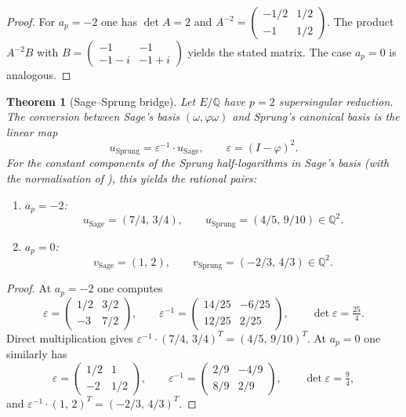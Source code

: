 \documentclass[11pt,a4paper]{amsart}
\newtheorem{theorem}{Theorem}[section]
\theoremstyle{definition}
\newcommand{\Q}{\mathbb{Q}}
\newcommand{\eps}{\varepsilon}
\begin{document}
\begin{proof}
For $a_p = -2$ one has $\det A = 2$ and
$A^{-2} = \begin{pmatrix} -1/2 & 1/2 \\ -1 & 1/2 \end{pmatrix}$.
The product $A^{-2} B$ with $B = \begin{pmatrix} -1 & -1 \\ -1-i & -1+i \end{pmatrix}$ yields the stated matrix. The case $a_p = 0$ is analogous.
\end{proof}

\begin{theorem}[Sage--Sprung bridge]\label{thm:bridge}
Let $E/\Q$ have $p = 2$ supersingular reduction. The conversion between Sage's basis $(\omega, \varphi\omega)$ and Sprung's canonical basis is the linear map
\begin{equation}
u_{\mathrm{Sprung}} = \eps^{-1} \cdot u_{\mathrm{Sage}}, \qquad \eps = (I - \varphi)^2.
\end{equation}
For the constant components of the Sprung half-logarithms in Sage's basis (with the normalisation of \cite[\S 5]{Sprung2012}), this yields the rational pairs:
\begin{enumerate}
\item[(i)] $a_p = -2$:
\begin{equation}
u_{\mathrm{Sage}} = (7/4,\, 3/4), \qquad u_{\mathrm{Sprung}} = (4/5,\, 9/10) \in \Q^2.
\end{equation}
\item[(ii)] $a_p = 0$:
\begin{equation}
v_{\mathrm{Sage}} = (1,\, 2), \qquad v_{\mathrm{Sprung}} = (-2/3,\, 4/3) \in \Q^2.
\end{equation}
\end{enumerate}
\end{theorem}

\begin{proof}
At $a_p = -2$ one computes
\[
\eps = \begin{pmatrix} 1/2 & 3/2 \\ -3 & 7/2 \end{pmatrix},
\qquad
\eps^{-1} = \begin{pmatrix} 14/25 & -6/25 \\ 12/25 & 2/25 \end{pmatrix},
\qquad
\det \eps = \tfrac{25}{4}.
\]
Direct multiplication gives $\eps^{-1} \cdot (7/4,\,3/4)^T = (4/5,\,9/10)^T$.
At $a_p = 0$ one similarly has
\[
\eps = \begin{pmatrix} 1/2 & 1 \\ -2 & 1/2 \end{pmatrix},
\qquad
\eps^{-1} = \begin{pmatrix} 2/9 & -4/9 \\ 8/9 & 2/9 \end{pmatrix},
\qquad
\det \eps = \tfrac{9}{4},
\]
and $\eps^{-1} \cdot (1,\,2)^T = (-2/3,\,4/3)^T$.
\end{proof}
\end{document}
